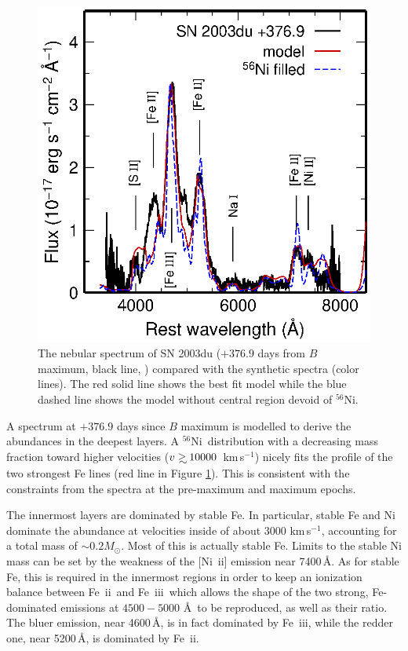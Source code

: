 \documentclass[usegraphicx,usenatbib]{mn2e}
\newcommand{\kms}{\mbox{\,km\,s$^{-1}$}}
\newcommand{\Msun}{M_{\odot}}
\newcommand{\FeII}{Fe~{\sc ii}}
\newcommand{\FeIII}{Fe~{\sc iii}}
\newcommand{\NiII}{Ni~{\sc ii}}
\newcommand{\Nifs}{$^{56}$Ni}
\def\gsim{\mathrel{\rlap{\lower 4pt \hbox{\hskip 1pt $\sim$}}\raise 1pt\hbox {$>$}}}
\begin{document}
\begin{figure}
  \includegraphics[scale=0.70]{f5.eps} 
  \caption{The nebular spectrum of SN 2003du 
($+376.9$ days from $B$ maximum,  black line, \citealt{stanishev07})
compared with the synthetic spectra (color lines).
The red solid line shows the best fit model while the blue dashed
line shows the model without central region devoid of \Nifs.
}
\label{fig:late}
\end{figure}

A spectrum at $+376.9$ days since $B$ maximum \citep{stanishev07} is modelled to
derive the abundances in the deepest layers. A \Nifs\ distribution with a
decreasing mass fraction toward higher velocities ($v \gsim 10000$ \kms) nicely
fits the profile of the two strongest Fe lines (red line in Figure
\ref{fig:late}).  This is consistent with the constraints from the spectra at
the pre-maximum and maximum epochs.

The innermost layers are dominated by stable Fe. In particular, stable Fe and Ni
dominate the abundance at velocities inside of about 3000\,\kms, accounting for
a total mass of $\sim 0.2 \Msun$. Most of this is actually stable Fe. Limits to
the stable Ni mass can be set by the weakness of the [\NiII] emission near
7400\,\AA. As for stable Fe, this is required in the innermost regions in order
to keep an ionization balance between \FeII\ and \FeIII\ which allows the shape
of the two strong, Fe-dominated emissions at $4500-5000$ \AA\ to be reproduced, 
as well as their ratio. The bluer emission, near 4600\,\AA, is in fact dominated
by \FeIII, while the redder one, near 5200\,\AA, is dominated by \FeII. 
\end{document}
